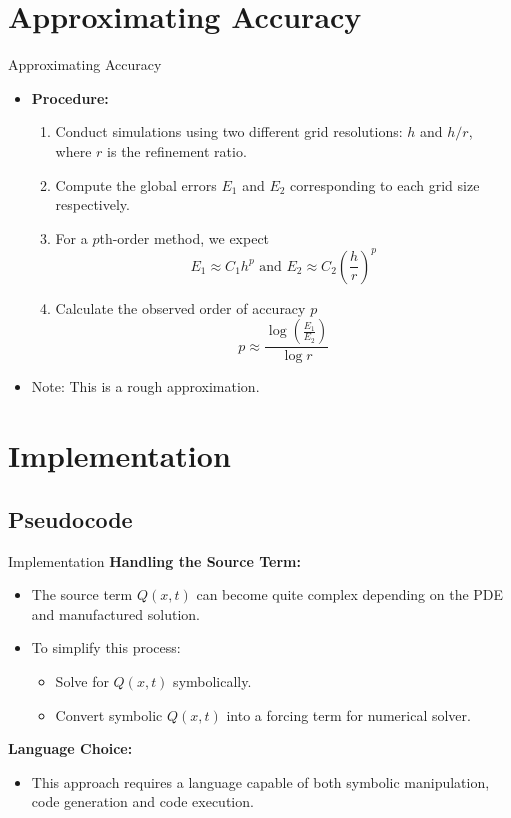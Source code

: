 \documentclass{beamer}
\begin{document}
\section{Approximating Accuracy}

\begin{frame}{Approximating Accuracy}
    \begin{itemize}
        \item \textbf{Procedure:}
            \begin{enumerate}
                \item Conduct simulations using two different grid resolutions: $h$ and $h/r$, where $r$ is the refinement ratio.
                \item Compute the global errors $E_1$ and $E_2$ corresponding to each grid size respectively.
                \item For a $p$th-order method, we expect
                \[
                    E_1 \approx C_1 h^p \text{ and } E_2 \approx C_2 \left(\frac{h}{r}\right)^p
                \]
                \item Calculate the observed order of accuracy $p$
                    \[
                        p \approx \frac{\log{\left(\frac{E_1}{E_2}\right)}}{\log{r}}
                    \]
                \end{enumerate}
            \item Note: This is a rough approximation. 
    \end{itemize}
\end{frame}


\section{Implementation}

\subsection{Pseudocode}

\begin{frame}{Implementation}
    \textbf{Handling the Source Term:}
    \begin{itemize}
        \item The source term \( Q(x,t) \) can become quite complex depending on the PDE and manufactured solution.
        \item To simplify this process:
        \begin{itemize}
            \item Solve for \( Q(x,t) \) symbolically.
            \item Convert symbolic \( Q(x,t) \) into a forcing term for numerical solver.
        \end{itemize}
    \end{itemize}
    \textbf{Language Choice:}
    \begin{itemize}
        \item This approach requires a language capable of both symbolic manipulation, code generation and code execution.
    \end{itemize}
\end{frame}
\end{document}
